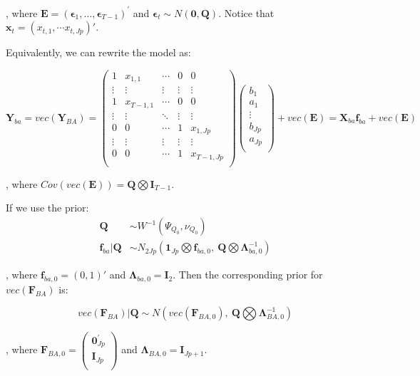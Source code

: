 \documentclass[]{article}
\begin{document}
, where
\(\mathbf{E} = \left( \bm{\epsilon}_{1},\ldots,\bm{\epsilon}_{T - 1} \right)^{'}\)
and \(\bm{\epsilon}_{t} \sim N(\mathbf{0},\mathbf{Q})\). Notice that
\(\mathbf{x}_{t} = (x_{t, 1}, \cdots x_{t, Jp})'\).

Equivalently, we can rewrite the model as:

\[\mathbf{Y}_{ba} = vec\left(\mathbf{Y}_{BA} \right) = \begin{pmatrix}
	1 & x_{1,1} & \cdots & 0 & 0 \\
	\vdots & \vdots & \vdots & \vdots & \vdots \\
	1 & x_{T - 1,1} & \cdots & 0 & 0 \\
	\vdots & \vdots & \ddots & \vdots & \vdots \\
	0 & 0 & \cdots & 1 & x_{1,Jp} \\
	\vdots & \vdots & \vdots & \vdots & \vdots \\
	0 & 0 & \cdots & 1 & x_{T - 1,Jp} \\
\end{pmatrix}\begin{pmatrix}
	b_{1} \\
	a_{1} \\
	\vdots \\
	b_{Jp} \\
	a_{Jp} \\
\end{pmatrix} + vec(\mathbf{E}) = \mathbf{X}_{ba}\mathbf{f}_{ba} + vec(\mathbf{E})\]

, where
\(Cov\left(vec(\mathbf{E}) \right) = \mathbf{Q}\bigotimes \mathbf{I}_{T - 1}\).

If we use the prior:
\begin{align*}
	\mathbf{Q} &\sim W^{- 1}(\Psi_{Q_{0}},\nu_{Q_{0}})\\
	\mathbf{f}_{ba}|\mathbf{Q} &\sim N_{2Jp}(\mathbf{1}_{Jp}\bigotimes \mathbf{f}_{ba,0},\ \mathbf{Q}\bigotimes\bm{\Lambda}_{ba,0}^{- 1})
\end{align*}

, where \(\mathbf{f}_{ba,0} = (0, 1)'\) and \(\bm{\Lambda}_{ba,0} = \mathbf{I}_{2}\). Then the
corresponding prior for \(vec(\mathbf{F}_{BA})\) is:

\[vec\left( \mathbf{F}_{BA} \right)|\mathbf{Q} \sim N(vec\left( \mathbf{F}_{BA,0} \right),\ \mathbf{Q}\bigotimes\bm{\Lambda}_{BA,0}^{- 1})\]

, where \(\mathbf{F}_{BA,0} = \begin{pmatrix}
	\mathbf{0}_{Jp}^{'} \\
	\mathbf{I}_{Jp} \\
\end{pmatrix}\) and \(\bm{\Lambda}_{BA,0} = \mathbf{I}_{Jp + 1}\).
\end{document}
